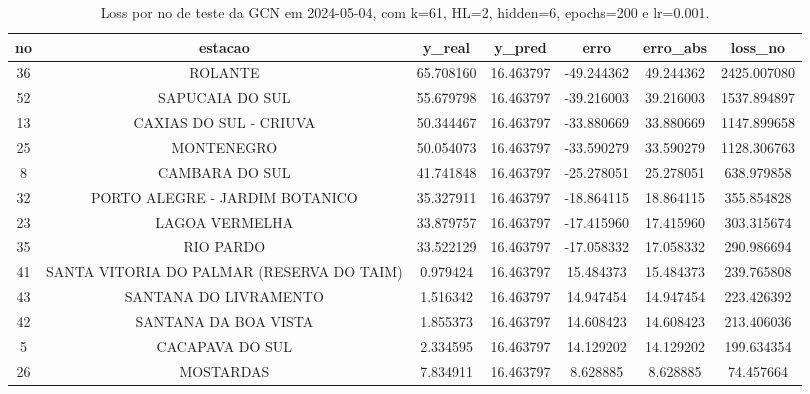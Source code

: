 \begin{table}[h]
\centering
\caption{Loss por no de teste da GCN em 2024-05-04, com k=61, HL=2, hidden=6, epochs=200 e lr=0.001.}
\label{tab:gcn_loss_k61_hl2_h6_e200_d20240504}
\begin{tabular}{ccccccc}
\toprule
no & estacao & y\_real & y\_pred & erro & erro\_abs & loss\_no \\
\midrule
36 & ROLANTE & 65.708160 & 16.463797 & -49.244362 & 49.244362 & 2425.007080 \\
52 & SAPUCAIA DO SUL & 55.679798 & 16.463797 & -39.216003 & 39.216003 & 1537.894897 \\
13 & CAXIAS DO SUL - CRIUVA & 50.344467 & 16.463797 & -33.880669 & 33.880669 & 1147.899658 \\
25 & MONTENEGRO & 50.054073 & 16.463797 & -33.590279 & 33.590279 & 1128.306763 \\
8 & CAMBARA DO SUL & 41.741848 & 16.463797 & -25.278051 & 25.278051 & 638.979858 \\
32 & PORTO ALEGRE - JARDIM BOTANICO & 35.327911 & 16.463797 & -18.864115 & 18.864115 & 355.854828 \\
23 & LAGOA VERMELHA & 33.879757 & 16.463797 & -17.415960 & 17.415960 & 303.315674 \\
35 & RIO PARDO & 33.522129 & 16.463797 & -17.058332 & 17.058332 & 290.986694 \\
41 & SANTA VITORIA DO PALMAR (RESERVA DO TAIM) & 0.979424 & 16.463797 & 15.484373 & 15.484373 & 239.765808 \\
43 & SANTANA DO LIVRAMENTO & 1.516342 & 16.463797 & 14.947454 & 14.947454 & 223.426392 \\
42 & SANTANA DA BOA VISTA & 1.855373 & 16.463797 & 14.608423 & 14.608423 & 213.406036 \\
5 & CACAPAVA DO SUL & 2.334595 & 16.463797 & 14.129202 & 14.129202 & 199.634354 \\
26 & MOSTARDAS & 7.834911 & 16.463797 & 8.628885 & 8.628885 & 74.457664 \\
\bottomrule
\end{tabular}
\end{table}
